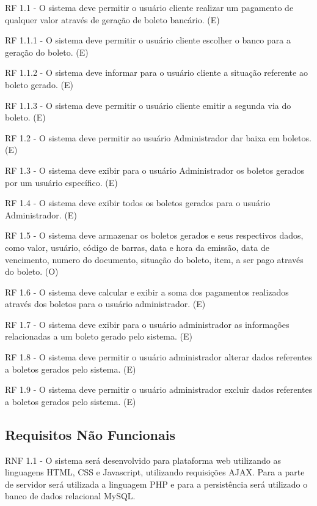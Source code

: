 \documentclass[12pt,a4paper,onecolumn,titlepage]{article}
\begin{document}
\begin{description} 


\item	RF 1.1 - O sistema deve permitir o usuário cliente realizar um pagamento de qualquer valor através de geração de boleto bancário. (E)
\item	RF 1.1.1 - O sistema deve permitir o usuário cliente escolher o banco para a geração do boleto. (E)
\item   RF 1.1.2 - O sistema deve informar para o usuário cliente a situação referente ao boleto gerado. (E)
\item	RF 1.1.3 - O sistema deve permitir o usuário cliente emitir a segunda via do boleto. (E)
\item   RF 1.2 - O sistema deve permitir ao usuário Administrador dar baixa em boletos. (E)
\item   RF 1.3 - O sistema deve exibir para o usuário Administrador os boletos gerados por um usuário específico. (E)
\item   RF 1.4 - O sistema deve exibir todos os boletos gerados para o usuário Administrador. (E)
\item   RF 1.5 - O sistema deve armazenar os boletos gerados e seus respectivos dados, como valor,
usuário, código de barras, data e hora da emissão, data de vencimento, numero do documento, situação do boleto, item, a ser pago através do boleto. (O)
\item   RF 1.6 - O sistema deve calcular e exibir a soma dos pagamentos realizados através dos boletos para o usuário administrador. (E)
\item   RF 1.7 - O sistema deve exibir para o usuário administrador as informações relacionadas a um boleto gerado pelo sistema. (E)
\item   RF 1.8 - O sistema deve permitir o usuário administrador alterar dados referentes a boletos gerados pelo sistema. (E)
\item   RF 1.9 - O sistema deve permitir o usuário administrador excluir dados referentes a boletos gerados pelo sistema. (E)
\end{description}

\subsection{Requisitos Não Funcionais}


\begin{description}
\item RNF 1.1 - O sistema será desenvolvido para plataforma web utilizando as  linguagens HTML, CSS e Javascript, utilizando requisições AJAX. Para
		a parte de servidor será utilizada a linguagem PHP e para a persistência
		será utilizado o banco de dados relacional MySQL.


\end{description}
\end{document}
